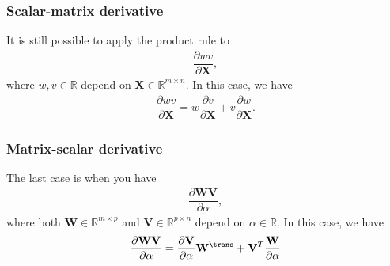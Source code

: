 \subsubsection{Scalar-matrix derivative}
It is still possible to apply the product rule to
\begin{align}
    \dfrac{\partial wv}{\partial \mathbf{X}},
\end{align}
where \(w,v \in \mathbb{R}\) depend on \(\mathbf{X} \in \mathbb{R}^{m \times n}\). In this case, we have
\begin{align}
    \dfrac{\partial wv}{\partial \mathbf{X}} = w \dfrac{\partial v}{\partial \mathbf{X}} + v \dfrac{\partial w}{\partial \mathbf{X}}.
\end{align}

\subsubsection{Matrix-scalar derivative}
The last case is when you have
\begin{align}
    \dfrac{\partial \mathbf{W}\mathbf{V}}{\partial \alpha},
\end{align}
where both \(\mathbf{W} \in \mathbb{R}^{m \times p}\) and \(\mathbf{V} \in \mathbb{R}^{p\times n}\) depend on \(\alpha \in \mathbb{R}\). In this case, we have
\begin{align}
    \label{eq:matrix-matrix-product-rule}
    \dfrac{\partial \mathbf{W}\mathbf{V}}{\partial \alpha} = \dfrac{\partial \mathbf{V}}{\partial \alpha}\mathbf{W}^{\trans} + \mathbf{V}^{T} \dfrac{\mathbf{W}}{\partial \alpha}
\end{align}
